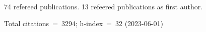 74 refereed publications. 13 refeered publications as first author.

Total citations~=~3294; h-index~=~32 (2023-06-01)